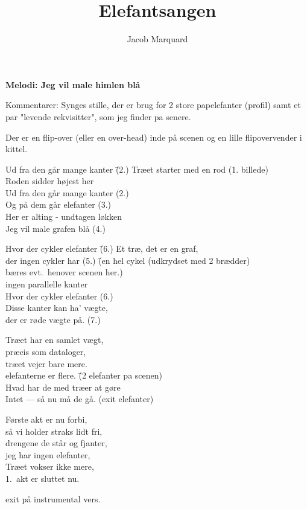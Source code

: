 \documentclass[a4paper,11pt]{article}
\title{Elefantsangen}
\author{Jacob Marquard}
\begin{document}
\maketitle

\begin{center}
{\bf Melodi: Jeg vil male himlen blå}
\end{center}
	
Kommentarer: Synges stille, der er brug for 2 store papelefanter (profil)
samt et par "levende rekvisitter", som jeg finder pa senere.

Der er en flip-over (eller en over-head) inde på scenen og en lille
flipovervender i kittel.



\begin{tabbing}
Ud fra den går mange kanter \hspace{1cm}	\=(2.) \kill 
Træet starter med en rod	\>(1. billede)\\ 
Roden sidder højest her\\ 
Ud fra den går mange kanter \>(2.)\\ 
Og på dem går elefanter \>(3.)\\ 
Her er alting - undtagen løkken\\
Jeg vil male grafen blå	\>(4.)\\
\end{tabbing}


\begin{tabbing}
Hvor der cykler elefanter	 \hspace{2cm}\=(6.) \kill
Et træ, det er en graf,\\
der ingen cykler har	\>(5.) \=(en hel cykel (udkrydset med 2 brædder)\\					\>\>bæres evt.\ henover scenen her.)\\
ingen parallelle kanter		\\
Hvor der cykler elefanter	\>(6.)\\
Disse kanter kan ha' vægte,\\
der er røde vægte på.	\>(7.)\\
\end{tabbing}


\begin{tabbing}
Træet har en samlet vægt,\\
præcis som dataloger,\\
træet vejer bare mere.\\
elefanterne er flere.		 \hspace{3cm}\=(2 elefanter pa scenen)\\
Hvad har de med træer at gøre\\
Intet --- så nu må de gå.	\>(exit elefanter)\\
\end{tabbing}

\begin{tabbing}
Første akt er nu forbi,\\
så vi holder straks lidt fri,\\
drengene de står og fjanter,\\
jeg har ingen elefanter,\\
Træet vokser ikke mere,\\
1.\ akt er sluttet nu.\\
\end{tabbing}

exit på instrumental vers.
\end{document}
